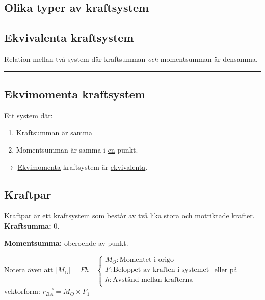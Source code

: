 \documentclass{article}
\newenvironment{ankiflashcard}[1]{}{}
\newcommand{\ruler}{
\rule{0.5\textwidth}{0.5pt}
}
\begin{document}
\begin{paracol}{2}
\section{Olika typer av kraftsystem}

\begin{ankiflashcard}{Vad är ekvivalenta kraftsystem? Vad kännetecknas de av?}
\subsection{Ekvivalenta kraftsystem}
Relation mellan två system där kraftsumman \textit{och} momentsumman är densamma.
\ruler
\end{ankiflashcard}

\begin{ankiflashcard}{Vad är ekvimomenta kraftsystem? Vad kännetecknas de av?}
\subsection{Ekvimomenta kraftsystem}
Ett system där:
\begin{enumerate}
    \item Kraftsumman är samma
    \item Momentsumman är samma i \underline{en} punkt.
\end{enumerate}
$\rightarrow$ \underline{Ekvimomenta} kraftsystem är \underline{ekvivalenta}.
\end{ankiflashcard}

\begin{ankiflashcard}{Vad är ett kraftpar, och vad kännetecknar kraftparet?}
    
\subsection{Kraftpar}
Kraftpar är ett kraftsystem som består av två lika stora och motriktade krafter.
\textbf{Kraftsumma:} $0$.


\textbf{Momentsumma:} oberoende av punkt.


Notera även att $\left\lvert M_O \right\rvert = Fh\quad\left\{\begin{array}{l}M_O: \text{Momentet i origo} \\F: \text{Beloppet av kraften i systemet} \\h: \text{Avstånd mellan krafterna} \\\end{array}\right.$
eller på vektorform: $\vec{r_{BA}} = M_O \times F_1$
\end{ankiflashcard}


\end{paracol}
\end{document}
